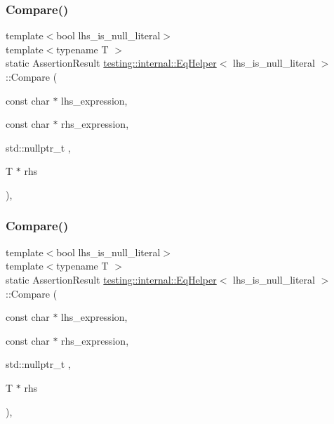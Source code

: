 \subsubsection{\texorpdfstring{Compare()}{Compare()}\hspace{0.1cm}{\footnotesize\ttfamily [7/8]}}
{\footnotesize\ttfamily template$<$bool lhs\+\_\+is\+\_\+null\+\_\+literal$>$ \\
template$<$typename T $>$ \\
static Assertion\+Result \mbox{\hyperlink{classtesting_1_1internal_1_1_eq_helper}{testing\+::internal\+::\+Eq\+Helper}}$<$ lhs\+\_\+is\+\_\+null\+\_\+literal $>$\+::Compare (\begin{DoxyParamCaption}\item[{const char $\ast$}]{lhs\+\_\+expression,  }\item[{const char $\ast$}]{rhs\+\_\+expression,  }\item[{std\+::nullptr\+\_\+t}]{,  }\item[{T $\ast$}]{rhs }\end{DoxyParamCaption})\hspace{0.3cm}{\ttfamily [inline]}, {\ttfamily [static]}}

\mbox{\label{classtesting_1_1internal_1_1_eq_helper_a2bbb6deaafe1ca824e94c0e20f1d824c}} 
\subsubsection{\texorpdfstring{Compare()}{Compare()}\hspace{0.1cm}{\footnotesize\ttfamily [8/8]}}
{\footnotesize\ttfamily template$<$bool lhs\+\_\+is\+\_\+null\+\_\+literal$>$ \\
template$<$typename T $>$ \\
static Assertion\+Result \mbox{\hyperlink{classtesting_1_1internal_1_1_eq_helper}{testing\+::internal\+::\+Eq\+Helper}}$<$ lhs\+\_\+is\+\_\+null\+\_\+literal $>$\+::Compare (\begin{DoxyParamCaption}\item[{const char $\ast$}]{lhs\+\_\+expression,  }\item[{const char $\ast$}]{rhs\+\_\+expression,  }\item[{std\+::nullptr\+\_\+t}]{,  }\item[{T $\ast$}]{rhs }\end{DoxyParamCaption})\hspace{0.3cm}{\ttfamily [inline]}, {\ttfamily [static]}}



